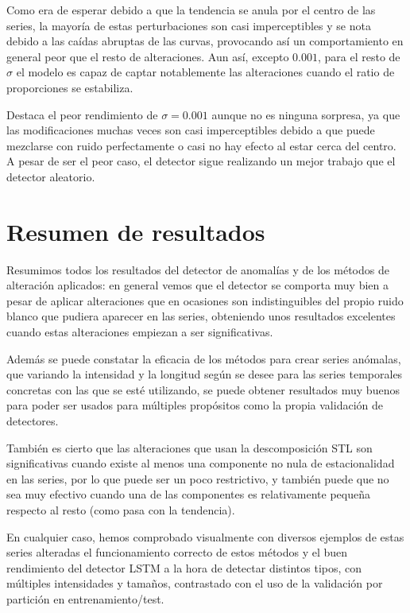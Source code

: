 Como era de esperar debido a que la tendencia se anula por el centro de las series, la mayoría de estas perturbaciones son casi imperceptibles y se nota debido a las caídas abruptas de las curvas, provocando así un comportamiento en general peor que el resto de alteraciones. Aun así, excepto $0.001$, para el resto de $\sigma$ el modelo es capaz de captar notablemente las alteraciones cuando el ratio de proporciones se estabiliza.

Destaca el peor rendimiento de $\sigma = 0.001$ aunque no es ninguna sorpresa, ya que las modificaciones muchas veces son casi imperceptibles debido a que puede mezclarse con ruido perfectamente o casi no hay efecto al estar cerca del centro. A pesar de ser el peor caso, el detector sigue realizando un mejor trabajo que el detector aleatorio.

\section{Resumen de resultados}

Resumimos todos los resultados del detector de anomalías y de los métodos de alteración aplicados: en general vemos que el detector se comporta muy bien a pesar de aplicar alteraciones que en ocasiones son indistinguibles del propio ruido blanco que pudiera aparecer en las series, obteniendo unos resultados excelentes cuando estas alteraciones empiezan a ser significativas.

Además se puede constatar la eficacia de los métodos para crear series anómalas, que variando la intensidad y la longitud según se desee para las series temporales concretas con las que se esté utilizando, se puede obtener resultados muy buenos para poder ser usados para múltiples propósitos como la propia validación de detectores.

También es cierto que las alteraciones que usan la descomposición STL son significativas cuando existe al menos una componente no nula de estacionalidad en las series, por lo que puede ser un poco restrictivo, y también puede que no sea muy efectivo cuando una de las componentes es relativamente pequeña respecto al resto (como pasa con la tendencia).

En cualquier caso, hemos comprobado visualmente con diversos ejemplos de estas series alteradas el funcionamiento correcto de estos métodos y el buen rendimiento del detector LSTM a la hora de detectar distintos tipos, con múltiples intensidades y tamaños, contrastado con el uso de la validación por partición en entrenamiento/test.




\endinput
